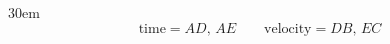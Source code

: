 \documentclass[border=4pt]{standalone}
\begin{document}
\begin{varwidth}{30em}
\large
\[ \text{time}=AD,\,AE \qquad \text{velocity}=DB,\,EC \]

\end{varwidth}
\end{document}
